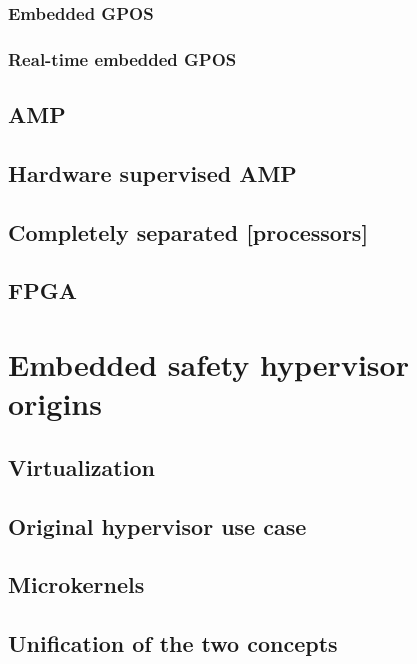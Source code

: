 \subsubsection{Embedded GPOS}
\subsubsection{Real-time embedded GPOS}
\subsection{AMP}
\subsection{Hardware supervised AMP}
\subsection{Completely separated [processors]}
\subsection{FPGA}


\section{Embedded safety hypervisor origins}
\subsection{Virtualization}
\subsection{Original hypervisor use case}
\subsection{Microkernels}
\subsection{Unification of the two concepts}



